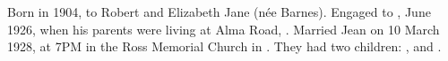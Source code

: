 
Born in  1904, to Robert and Elizabeth Jane (n\'{e}e Barnes).\cite{BMD_WA_birth_1904}
Engaged to , June 1926,
when his parents were living at Alma Road, .\cite{JeanRobertAgnewEngagement}
Married Jean on 10 March 1928,\cite{WestAust1928}
at 7PM in the Ross Memorial Church in .
They had two children: , and .
